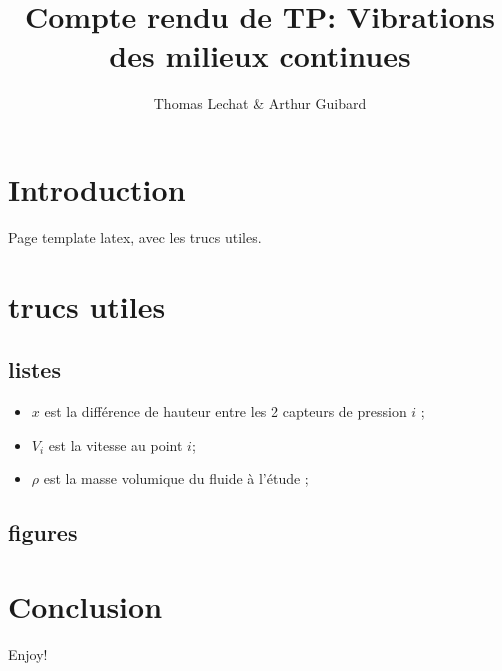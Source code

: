 \documentclass[a4paper]{article}
\title{Compte rendu de TP: Vibrations des milieux continues }
\author{Thomas Lechat \& Arthur Guibard}
\begin{document}
\maketitle

\section{Introduction}
Page template latex, avec les trucs utiles.

\section{trucs utiles}

\subsection{listes}
\begin{itemize}
	\item $x$ est la différence de hauteur entre les 2 capteurs de pression $i$ ;
    \item $V_i$ est la vitesse au point $i$;
    \item $\rho$ est la masse volumique du fluide à l'étude ;
\end{itemize}

\subsection{figures}


\section{Conclusion}
Enjoy!
\end{document}
